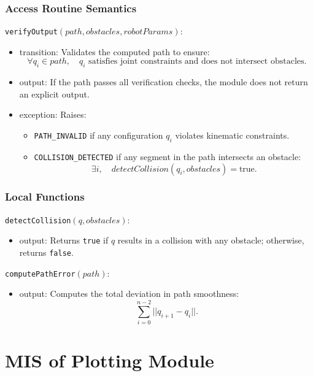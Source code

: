 \documentclass[12pt, titlepage]{article}
\begin{document}
\subsubsection{Access Routine Semantics}

\noindent \texttt{verifyOutput}$(path, obstacles, robotParams)$:
\begin{itemize}
    \item transition: Validates the computed path to ensure:
    \[
    \forall q_i \in path, \quad q_i \text{ satisfies joint constraints and does not intersect obstacles.}
    \]
    \item output: If the path passes all verification checks, the module does not return an explicit output.
    \item exception: Raises:
    \begin{itemize}
        \item \texttt{PATH\_INVALID} if any configuration \( q_i \) violates kinematic constraints.
        \item \texttt{COLLISION\_DETECTED} if any segment in the path intersects an obstacle:
        \[
        \exists i, \quad detectCollision(q_i, obstacles) = \text{true}.
        \]
    \end{itemize}
\end{itemize}

\subsubsection{Local Functions}

\noindent \texttt{detectCollision}$(q, obstacles)$:
\begin{itemize}
    \item output: Returns \texttt{true} if \( q \) results in a collision with any obstacle; otherwise, returns \texttt{false}.
\end{itemize}

\noindent \texttt{computePathError}$(path)$:
\begin{itemize}
    \item output: Computes the total deviation in path smoothness:
    \[
    \sum_{i=0}^{n-2} ||q_{i+1} - q_i||.
    \]
\end{itemize}

\newpage

\section{MIS of Plotting Module} \label{Module:Plotting}
\end{document}
